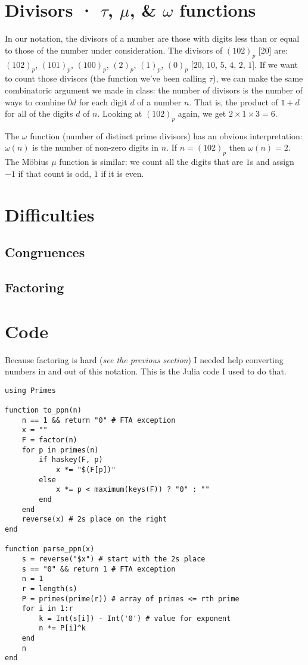 \documentclass[12pt]{article}
\newcommand{\ppn}[1]{(#1)_p}
\begin{document}
\section*{Divisors · $\tau$, $\mu$, \& $\omega$ functions}
In our notation, the divisors of a number are those with digits less than or equal to those of the number under consideration. The divisors of $\ppn{102}$ [20] are: $\ppn{102}$, $\ppn{101}$, $\ppn{100}$, $\ppn{2}$, $\ppn{1}$, $\ppn{0}$ [$20$, $10$, $5$, $4$, $2$, $1$]. If we want to count those divisors (the function we've been calling $\tau$), we can make the same combinatoric argument we made in class: the number of divisors is the number of ways to combine $0$\textendash$d$ for each digit $d$ of a number $n$. That is, the product of $1 + d$ for all of the digits $d$ of $n$. Looking at $\ppn{102}$ again, we get $2 \times 1 \times 3 = 6$.

The $\omega$ function (number of distinct prime divisors) has an obvious interpretation: $\omega(n)$ is the number of non-zero digits in $n$. If $n = \ppn{102}$ then $\omega(n) = 2$. The Möbius $\mu$ function is similar: we count all the digits that are $1$s and assign $-1$ if that count is odd, $1$ if it is even.

\section*{Difficulties}
\subsection*{Congruences}
\subsection*{Factoring}

\section*{Code}
Because factoring is hard (\textit{see the previous section}) I needed help converting numbers in and out of this notation. This is the Julia code I used to do that.

\begin{verbatim}
using Primes

function to_ppn(n)
    n == 1 && return "0" # FTA exception
    x = ""
    F = factor(n)
    for p in primes(n)
        if haskey(F, p)
            x *= "$(F[p])"
        else
            x *= p < maximum(keys(F)) ? "0" : ""
        end
    end
    reverse(x) # 2s place on the right
end

function parse_ppn(x)
    s = reverse("$x") # start with the 2s place
    s == "0" && return 1 # FTA exception
    n = 1
    r = length(s)
    P = primes(prime(r)) # array of primes <= rth prime
    for i in 1:r
        k = Int(s[i]) - Int('0') # value for exponent
        n *= P[i]^k
    end
    n
end
\end{verbatim}
\end{document}
